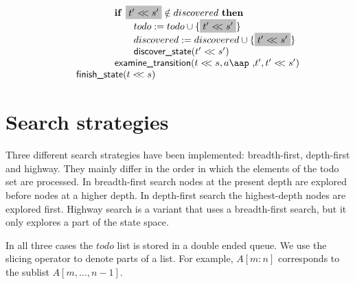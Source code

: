 \documentclass{article}
\newcommand{\at}[1]{\mbox{\aap ,} #1}
\newcommand{\aftertime}{\ensuremath{<\!\!<}}
\newcommand{\Space}{\text{\ }}
\newcommand{\If}{\text{\textbf{if }}}
\newcommand{\Then}{\text{\textbf{then }}}
\begin{document}
\[\begin{tabular}{l}
\qquad \qquad \qquad $\If \colorbox{lightgray}{$t' \aftertime s'$} \notin discovered \Space \Then$ \\
\qquad \qquad \qquad \qquad $todo := todo \cup \{ \colorbox{lightgray}{$t' \aftertime s'$} \}$ \\
\qquad \qquad \qquad \qquad $discovered := discovered \cup \{ \colorbox{lightgray}{$t' \aftertime s'$} \}$ \\
\qquad \qquad \qquad \qquad $\textsf{discover\_state}( t' \aftertime s' )$ \\
\qquad \qquad \qquad $\textsf{examine\_transition}(t \aftertime s, a \at t', t' \aftertime s')$ \\
\qquad $\textsf{finish\_state}(t \aftertime s)$ \\
\end{tabular}
\]

\newpage
\section{Search strategies}

Three different search strategies have been implemented: breadth-first, depth-first and highway. They mainly differ in the order in which the elements of the todo set are processed. In breadth-first search nodes at the present depth are explored before nodes at a higher depth. In depth-first search the highest-depth nodes are explored first. Highway search is a variant that uses a breadth-first search, but it only explores a part of the state space.

In all three cases the $todo$ list is stored in a double ended queue. We use the slicing operator to denote parts of a list. For example, $A[m:n]$ corresponds to the sublist $A[m,\ldots,n-1]$.
\end{document}
